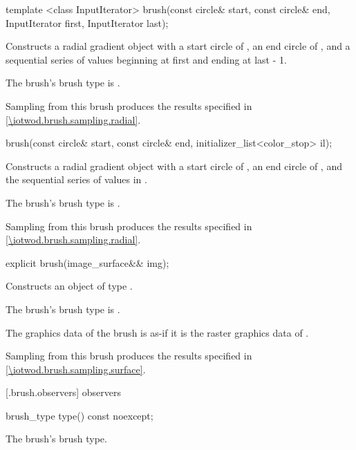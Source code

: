 %
\begin{itemdecl}
template <class InputIterator>
brush(const circle& start, const circle& end,
  InputIterator first, InputIterator last);
\end{itemdecl}
\begin{itemdescr}
\pnum
\effects
Constructs a radial gradient  object with a start circle of , an end circle of ,  and a sequential series of  values beginning at {first} and ending at {last - 1}.

\pnum
The brush's brush type is .

\pnum
\remarks
Sampling from this brush produces the results specified in \ref{\iotwod.brush.sampling.radial}.
\end{itemdescr}

%
\begin{itemdecl}
brush(const circle& start, const circle& end,
  initializer_list<color_stop> il);
\end{itemdecl}
\begin{itemdescr}
\pnum
\effects
Constructs a radial gradient  object with a start circle of , an end circle of , and the sequential series of  values in .

\pnum
The brush's brush type is .

\pnum
\remarks
Sampling from this brush produces the results specified in \ref{\iotwod.brush.sampling.radial}.
\end{itemdescr}

%
\begin{itemdecl}
explicit brush(image_surface&& img);
\end{itemdecl}
\begin{itemdescr}
\pnum
\effects
Constructs an object of type .

\pnum
The brush's brush type is .

\pnum
The graphics data of the brush is as-if it is the raster graphics data of .

\pnum
\remarks
Sampling from this brush produces the results specified in \ref{\iotwod.brush.sampling.surface}.
\end{itemdescr}

 [\iotwod.brush.observers]{ observers}

%
\begin{itemdecl}
brush_type type() const noexcept;
\end{itemdecl}
\begin{itemdescr}
\pnum
\returns
The brush's brush type.
\end{itemdescr}
